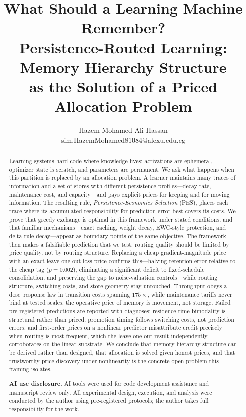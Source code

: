 \documentclass[11pt]{article}
\title{What Should a Learning Machine Remember?\\[4pt]
\large Persistence-Routed Learning: Memory Hierarchy Structure\\as the Solution of a Priced Allocation Problem}
\author{Hazem Mohamed Ali Hassan\\
\small sim.HazemMohamed81084@alexu.edu.eg}
\date{}
\begin{document}
\maketitle

\begin{abstract}
Learning systems hard-code where knowledge lives: activations are ephemeral, optimizer state is
scratch, and parameters are permanent. We ask what happens when this partition is replaced by an
allocation problem. A learner maintains many traces of information and a set of stores with different
persistence profiles---decay rate, maintenance cost, and capacity---and pays explicit prices for
keeping and for moving information. The resulting rule, \emph{Persistence-Economics Selection} (PES),
places each trace where its accumulated responsibility for prediction error best covers its costs. We
prove that greedy exchange is optimal in this framework under stated conditions, and that familiar
mechanisms---exact caching, weight decay, EWC-style protection, and delta-rule decay---appear as
boundary points of the same objective. The framework then makes a falsifiable prediction that we test:
routing quality should be limited by price quality, not by routing structure. Replacing a cheap
gradient-magnitude price with an exact leave-one-out loss price confirms this---halving retention error
relative to the cheap tag ($p=0.002$), eliminating a significant deficit to fixed-schedule
consolidation, and preserving the gap to noise-valuation controls---while routing structure, switching
costs, and store geometry stay untouched. Throughput obeys a dose--response law in transition costs
spanning $175\times$, while maintenance tariffs never bind at tested scales; the operative price of
memory is movement, not storage. Failed pre-registered predictions are reported with diagnoses:
residence-time bimodality is structural rather than priced; promotion timing follows switching costs,
not prediction errors; and first-order prices on a nonlinear predictor misattribute credit precisely
when routing is most frequent, which the leave-one-out result independently corroborates on the linear
substrate. We conclude that memory hierarchy structure can be derived rather than designed, that
allocation is solved given honest prices, and that trustworthy price discovery under nonlinearity is
the concrete open problem this framing isolates.

\medskip
\noindent\textbf{AI use disclosure.} AI tools were used for code development assistance and manuscript
review only. All experimental design, execution, and analysis were conducted by the author using
pre-registered protocols; the author takes full responsibility for the work.
\end{abstract}
\end{document}
